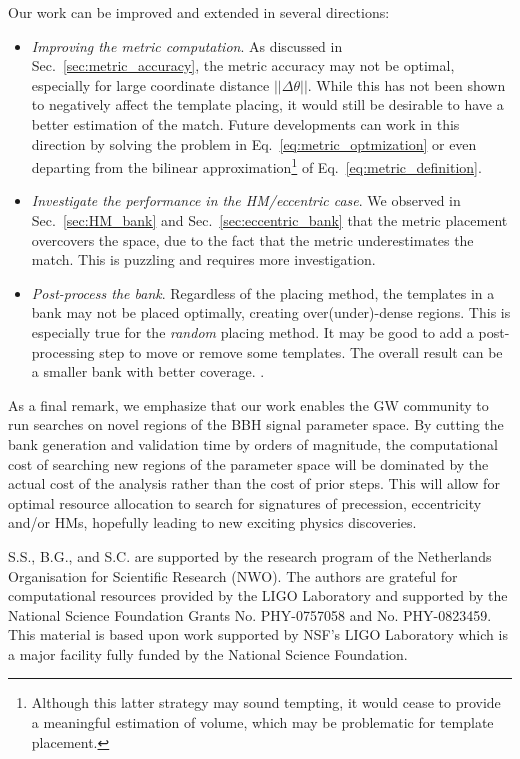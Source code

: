 \documentclass[twocolumn,showpacs,preprintnumbers,nofootinbib,prd,
superscriptaddress,10pt]{revtex4-2}
\begin{document}
Our work can be improved and extended in several directions:
\begin{itemize}
	\item {\it Improving the metric computation}. As discussed in Sec.~\ref{sec:metric_accuracy}, the metric accuracy may not be optimal, especially for large coordinate distance $||\Delta\theta||$. While this has not been shown to negatively affect the template placing, it would still be desirable to have a better estimation of the match. Future developments can work in this direction by solving the problem in Eq.~\eqref{eq:metric_optmization} or even departing from the bilinear approximation\footnote{
Although this latter strategy may sound tempting, it would cease to provide a meaningful estimation of volume, which may be problematic for template placement.} of Eq.~\eqref{eq:metric_definition}.
	
	\item {\it Investigate the performance in the HM/eccentric case}. We observed in Sec.~\ref{sec:HM_bank} and Sec.~\ref{sec:eccentric_bank} that the metric placement overcovers the space, due to the fact that the metric underestimates the match. This is puzzling and requires more investigation.
	
	\item {\it Post-process the bank}. Regardless of the placing method, the templates in a bank may not be placed optimally, creating over(under)-dense regions. This is especially true for the {\it random} placing method. It may be good to add a post-processing step to move or remove some templates. The overall result can be a smaller bank with better coverage. \cite{Indik:2017vqq}.
\end{itemize}

As a final remark, we emphasize that our work enables the GW community to run searches on novel regions of the BBH signal parameter space. By cutting the bank generation and validation time by orders of magnitude, the computational cost of searching new regions of the parameter space will be dominated by the actual cost of the analysis rather than the cost of prior steps.
This will allow for optimal resource allocation to search for signatures of precession, eccentricity and/or HMs, hopefully leading to new exciting physics discoveries.

        \begin{acknowledgments}
		S.S., B.G., and S.C. are supported by the research program of the Netherlands Organisation for Scientific Research (NWO).
		The authors are grateful for computational resources provided by the LIGO Laboratory and supported by the National Science Foundation Grants No. PHY-0757058 and No. PHY-0823459. This material is based upon work supported by NSF’s LIGO Laboratory which is a major facility fully funded by the National Science Foundation.
        \end{acknowledgments}
\end{document}
